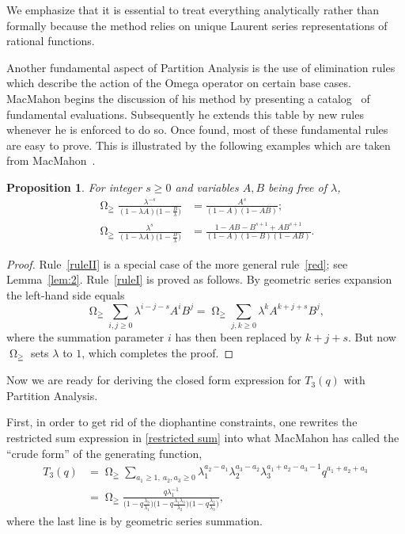 \documentclass[reqno]{amsart}
\newcommand{\lam}{\lambda}
\DeclareMathOperator*{\Omegaoper}{\Omega}
\newcommand{\Omegaop}{\Omegaoper_{\scriptscriptstyle \geqq}}
\theoremstyle{plain}
\newtheorem{proposition}{Proposition}
\theoremstyle{definition}
\theoremstyle{remark}
\begin{document}
We emphasize that it is essential to treat everything analytically rather
than formally because the method relies on unique Laurent series
representations of rational functions.

Another fundamental aspect of Partition Analysis is the
use of elimination rules which describe the action of the Omega
operator on certain base cases. MacMahon begins the discussion
of his method by presenting
a catalog~\cite[Vol.~II, pp.~102--106]{MacMahon:CA} of fundamental
evaluations. Subsequently he extends this table by new rules whenever
he is enforced to do so. Once found, most of these fundamental rules
are easy to prove. This is illustrated by the following examples which
are taken from MacMahon~\cite[Vol.~II, Art.~354, p.~106]{MacMahon:CA}.

\begin{proposition} \label{prop:1}
For integer $s\ge 0$ and variables $A, B$ being free of $\lam$,
\begin{align} \label{ruleI}
\Omegaop \frac{\lambda^{-s}}{(1-\lambda A) \big(1-\frac{B}{\lambda}\big)} & =
  \frac{A^{s}}{ (1-A) (1-A B)}; \\
\label{ruleII}
\Omegaop \frac{\lambda^s}{ (1-\lambda A) \big(1-\frac{B}{\lambda} \big)} & =
  \frac{ 1-A B - B^{s+1}+A B^{s+1}}
  { (1-A)(1-B)(1-A B) }.
\end{align}
\end{proposition}

\begin{proof} Rule~\eqref{ruleII}
is a special case of the more general rule~\eqref{red};
see Lemma~\ref{lem:2}. Rule~\eqref{ruleI} is proved as follows.
By geometric series expansion the left-hand side equals
\[
\Omegaop \sum_{i,j \ge 0} \lam^{i-j-s} A^i B^j =
\Omegaop \sum_{j,k \ge 0} \lam^k A^{k+j+s} B^j,
\]
where the summation parameter $i$ has then been replaced by $k+j+s$.
But now $\Omegaop$ sets $\lam$ to $1$, which completes the proof.
\end{proof}

Now we are ready for deriving the closed form
expression for $T_3(q)$
with Partition Analysis.

First, in order to get rid of the
diophantine constraints, one rewrites the restricted sum
expression in \eqref{restricted sum} into what MacMahon has
called the ``crude form'' of the generating function,
\begin{align*}
T_3(q) & =  \Omegaop \sum_{a_1 \ge 1,~a_2,a_3 \ge 0}
\lam_1^{a_2-a_1} \lam_2^{a_3-a_2} \lam_3^{a_1+a_2-a_3-1}
q^{a_1+a_2+a_3} \\
& = \Omegaop \frac{q \lambda_1^{-1}}
{\big(1- q \frac{\lam_3}{\lam_1} \big)
\big(1-q \frac{\lam_1\lam_3}{\lam_2} \big)
\big(1-q \frac{\lam_2}{\lam_3} \big)},
\end{align*}
where the last line is by geometric series summation.
\end{document}
